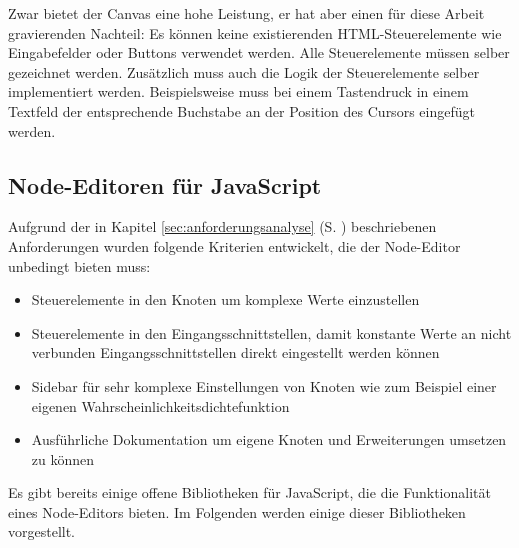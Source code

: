 Zwar bietet der Canvas eine hohe Leistung, er hat aber einen für diese Arbeit gravierenden Nachteil: Es können keine existierenden \ac{HTML}-Steuerelemente wie Eingabefelder oder Buttons verwendet werden. Alle Steuerelemente müssen selber gezeichnet werden. Zusätzlich muss auch die Logik der Steuerelemente selber implementiert werden. Beispielsweise muss bei einem Tastendruck in einem Textfeld der entsprechende Buchstabe an der Position des Cursors eingefügt werden.

\subsection{Node-Editoren für JavaScript}

Aufgrund der in Kapitel \ref{sec:anforderungsanalyse} (S. \pageref{sec:anforderungsanalyse}) beschriebenen Anforderungen wurden folgende Kriterien entwickelt, die der Node-Editor unbedingt bieten muss:
\begin{itemize}
    \item Steuerelemente in den Knoten um komplexe Werte einzustellen
    \item Steuerelemente in den Eingangsschnittstellen, damit konstante Werte an nicht verbunden Eingangsschnittstellen direkt eingestellt werden können
    \item Sidebar für sehr komplexe Einstellungen von Knoten wie zum Beispiel einer eigenen Wahrscheinlichkeitsdichtefunktion
    \item Ausführliche Dokumentation um eigene Knoten und Erweiterungen umsetzen zu können
\end{itemize}

Es gibt bereits einige offene Bibliotheken für JavaScript, die die Funktionalität eines Node-Editors bieten. Im Folgenden werden einige dieser Bibliotheken vorgestellt.

